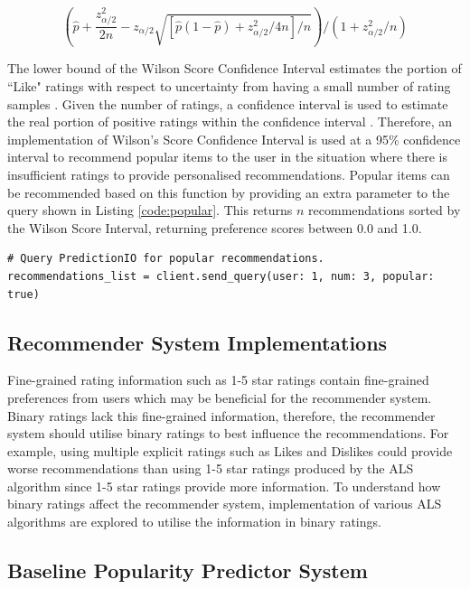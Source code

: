 \begin{equation} \label{wilson}
\left(\hat{p} + \frac{z^2_{\alpha/2}}{2n} - z_{\alpha/2} \sqrt{[\hat{p}(1-\hat{p}) + z^2_{\alpha/2}/4n]/n}\right)/(1 + z^2_{\alpha/2}/n)
\end{equation}

The lower bound of the Wilson Score Confidence Interval estimates the portion of ``Like" ratings with respect to uncertainty from having a small number of rating samples \cite{popularity}. Given the number of ratings, a confidence interval is used to estimate the real portion of positive ratings within the confidence interval \cite{popularity}. Therefore, an implementation of Wilson's Score Confidence Interval is used at a 95\% confidence interval to recommend popular items to the user in the situation where there is insufficient ratings to provide personalised recommendations. 
Popular items can be recommended based on this function by providing an extra parameter to the query shown in Listing \ref{code:popular}. This returns $n$ recommendations sorted by the Wilson Score Interval, returning preference scores between 0.0 and 1.0.

\begin{lstlisting}[caption={Query for popular recommendations}, label={code:popular}]
# Query PredictionIO for popular recommendations.
recommendations_list = client.send_query(user: 1, num: 3, popular: true)
\end{lstlisting}

\subsection{Recommender System Implementations} \label{algorithms}

Fine-grained rating information such as 1-5 star ratings contain fine-grained preferences from users which may be beneficial for the recommender system. Binary ratings lack this fine-grained information, therefore, the recommender system should utilise binary ratings to best influence the recommendations. For example, using multiple explicit ratings such as Likes and Dislikes could provide worse recommendations than using 1-5 star ratings produced by the ALS algorithm since 1-5 star ratings provide more information. To understand how binary ratings affect the recommender system, implementation of various ALS algorithms are explored to utilise the information in binary ratings.

\subsection{Baseline Popularity Predictor System} \label{baseline}

